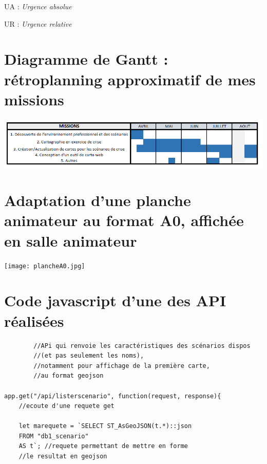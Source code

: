 \documentclass[10pt,a4paper]{report} %
\begin{document}
UA : \textit{Urgence absolue}


UR : \textit{Urgence relative}

\newpage

\listoffigures

\begin{appendices} %
    \addappheadtotoc %

    \appendixpage %
    
    \section{Diagramme de Gantt : rétroplanning approximatif de mes missions}
    \begin{center}
        \includegraphics[angle = 90, ]{gantt.png}
    \end{center}

    \section{Adaptation d’une planche animateur au format A0, affichée en salle animateur}
    \begin{center}
        \texttt{[image: plancheA0.jpg]}
    \end{center}
    \newpage
    \section{Code javascript d'une des API réalisées}   
    \begin{verbatim}
        //APi qui renvoie les caractéristiques des scénarios dispos 
        //(et pas seulement les noms), 
        //notamment pour affichage de la première carte, 
        //au format geojson

app.get("/api/listerscenario", function(request, response){ 
    //ecoute d'une requete get 

    let marequete = `SELECT ST_AsGeoJSON(t.*)::json
    FROM "db1_scenario" 
    AS t`; //requete permettant de mettre en forme 
    //le resultat en geojson


\end{verbatim}
\end{appendices}
\end{document}

